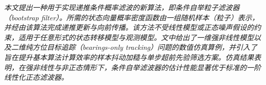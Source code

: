 \emph{本文提出一种用于实现递推条件概率滤波的新算法，即条件自举粒子滤波器（bootstrap filter）。所需的状态向量概率密度函数由一组随机样本（粒子）表示，并经由该算法完成递推更新与向前传播。该方法不受线性模型或正态噪声假设的约束，适用于任意形式的状态转移模型与观测模型。文中给出了一维强非线性模型以及二维纯方位目标追踪（bearings-only tracking）问题的数值仿真算例，并引入了旨在提升基本算法计算效率的样本抖动加糙与单步超前先验筛选方案。仿真结果表明，在强非线性与非正态情形下，条件自举滤波器的估计性能显著优于标准的一阶线性化正态滤波器。}
